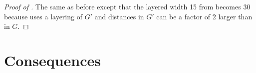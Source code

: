 \documentclass{patmorin}
\begin{document}
\begin{proof}[Proof of ]
  The same as before except that the layered width 15 from  becomes 30 because  uses a layering of $G'$ and distances in $G'$ can be a factor of 2 larger than in $G$.
\end{proof}

\section{Consequences}



\end{document}

